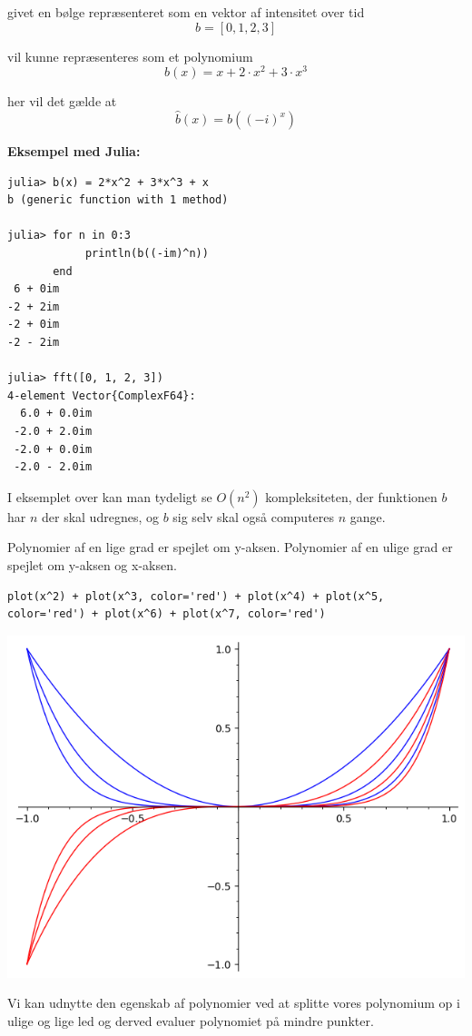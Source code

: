 \documentclass[11pt,a4paper]{article}
\begin{document}
givet en bølge repræsenteret som en vektor af intensitet over tid
$$
b = [0, 1, 2, 3]
$$

vil kunne repræsenteres som et polynomium
$$
b(x) = x + 2\cdot x^2 + 3\cdot x^3
$$

her vil det gælde at
$$
\hat{b}(x) = b((-i)^x)
$$

\textbf{Eksempel med Julia:}
\begin{verbatim}
julia> b(x) = 2*x^2 + 3*x^3 + x
b (generic function with 1 method)

julia> for n in 0:3
            println(b((-im)^n))
       end
 6 + 0im
-2 + 2im
-2 + 0im
-2 - 2im

julia> fft([0, 1, 2, 3])
4-element Vector{ComplexF64}:
  6.0 + 0.0im
 -2.0 + 2.0im
 -2.0 + 0.0im
 -2.0 - 2.0im
\end{verbatim}

I eksemplet over kan man tydeligt se \(O(n^2)\) kompleksiteten,
der funktionen \(b\) har \(n\) der skal udregnes,
og \(b\) sig selv skal også computeres \(n\) gange.

Polynomier af en lige grad er spejlet om y-aksen.
Polynomier af en ulige grad er spejlet om y-aksen og x-aksen.

\begin{verbatim}
plot(x^2) + plot(x^3, color='red') + plot(x^4) + plot(x^5, color='red') + plot(x^6) + plot(x^7, color='red')
\end{verbatim}

\begin{center}
\includegraphics[width=.9\linewidth]{even_and_odd.png}
\end{center}

Vi kan udnytte den egenskab af polynomier ved at splitte vores polynomium op i ulige og lige led
og derved evaluer polynomiet på mindre punkter.
\end{document}
